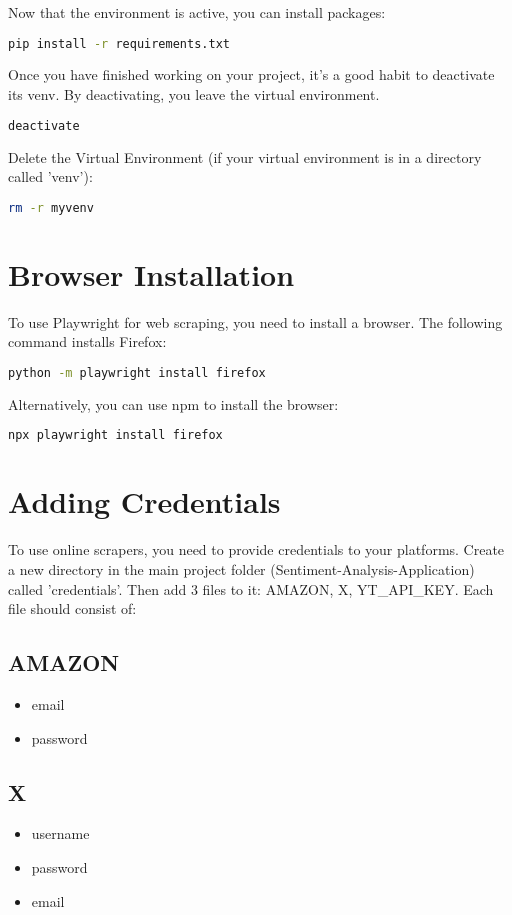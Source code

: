 \documentclass[a4paper]{article}
\begin{document}
Now that the environment is active, you can install packages:
\begin{lstlisting}[language=bash]
pip install -r requirements.txt
\end{lstlisting}

Once you have finished working on your project, it’s a good habit to deactivate its venv. By deactivating, you leave the virtual environment.
\begin{lstlisting}[language=bash]
deactivate
\end{lstlisting}

Delete the Virtual Environment (if your virtual environment is in a directory called 'venv'):
\begin{lstlisting}[language=bash]
rm -r myvenv
\end{lstlisting}

\section{Browser Installation}
To use Playwright for web scraping, you need to install a browser. The following command installs Firefox:
\begin{lstlisting}[language=bash]
python -m playwright install firefox
\end{lstlisting}

Alternatively, you can use npm to install the browser:
\begin{lstlisting}[language=bash]
npx playwright install firefox
\end{lstlisting}

\section{Adding Credentials}
To use online scrapers, you need to provide credentials to your platforms. Create a new directory in the main project folder (Sentiment-Analysis-Application) called 'credentials'. Then add 3 files to it: AMAZON, X, YT_API_KEY. Each file should consist of:

\subsection{AMAZON}
\begin{itemize}
    \item email
    \item password
\end{itemize}

\subsection{X}
\begin{itemize}
    \item username
    \item password
    \item email
\end{itemize}
\end{document}
